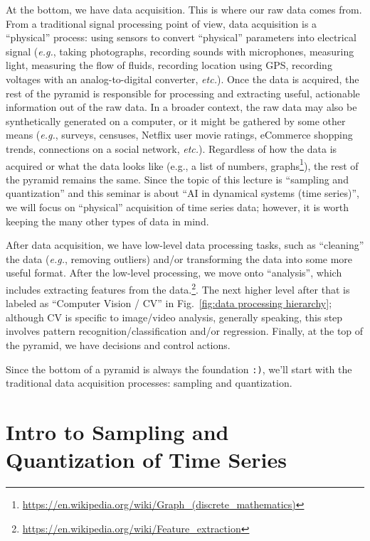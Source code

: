 \documentclass[11pt]{article}
\newcommand{\figref}[1]{Fig.~\ref{#1}}
\newcommand{\eg}{\emph{e.g.}}
\newcommand{\etc}{\emph{etc.}}
\begin{document}
At the bottom, we have data acquisition. This is where our raw data comes from. From a traditional signal processing point of view, data acquisition is a ``physical'' process: using sensors to convert ``physical'' parameters into electrical signal (\eg, taking photographs, recording sounds with microphones, measuring light, measuring the flow of fluids, recording location using GPS, recording voltages with an analog-to-digital converter, \etc). Once the data is acquired, the rest of the pyramid is responsible for processing and extracting useful, actionable information out of the raw data. In a broader context, the raw data may also be synthetically generated on a computer, or it might be gathered by some other means (\eg, surveys, censuses, Netflix user movie ratings, eCommerce shopping trends, connections on a social network, \etc). Regardless of how the data is acquired or what the data looks like (e.g., a list of numbers, graphs\footnote{\href{https://en.wikipedia.org/wiki/Graph\_(discrete\_mathematics)}{https://en.wikipedia.org/wiki/Graph\_(discrete\_mathematics)}}), the rest of the pyramid remains the same. Since the topic of this lecture is ``sampling and quantization'' and this seminar is about ``AI in dynamical systems (time series)'', we will focus on ``physical'' acquisition of time series data; however, it is worth keeping the many other types of data in mind.

After data acquisition, we have low-level data processing tasks, such as ``cleaning'' the data (\eg, removing outliers) and/or transforming the data into some more useful format. After the low-level processing, we move onto ``analysis'', which includes extracting features from the data.\footnote{\href{https://en.wikipedia.org/wiki/Feature_extraction}{https://en.wikipedia.org/wiki/Feature\_extraction}}. The next higher level after that is labeled as ``Computer Vision / CV'' in \figref{fig:data processing hierarchy}; although CV is specific to image/video analysis, generally speaking, this step involves pattern recognition/classification and/or regression. Finally, at the top of the pyramid, we have decisions and control actions.

Since the bottom of a pyramid is always the foundation \texttt{:)}, we'll start with the traditional data acquisition processes: sampling and quantization.

\section{Intro to Sampling and Quantization of Time Series}
\end{document}
